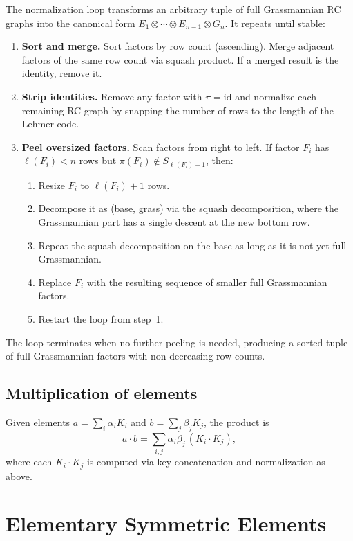 \documentclass[11pt]{article}
\newcommand{\Sym}{S}
\newcommand{\id}{\mathrm{id}}
\newcommand{\tens}{\otimes}
\theoremstyle{definition}
\begin{document}
The normalization loop transforms an arbitrary tuple of full Grassmannian RC graphs into the canonical form $E_1 \tens \cdots \tens E_{n-1} \tens G_n$.  It repeats until stable:

\begin{enumerate}
  \item \textbf{Sort and merge.}  Sort factors by row count (ascending).  Merge adjacent factors of the same row count via squash product.  If a merged result is the identity, remove it.

  \item \textbf{Strip identities.}  Remove any factor with $\pi = \id$ and normalize each remaining RC graph by snapping the number of rows to the length of the Lehmer code.

  \item \textbf{Peel oversized factors.}  Scan factors from right to left.  If factor $F_i$ has $\ell(F_i) < n$ rows but $\pi(F_i) \notin \Sym_{\ell(F_i)+1}$, then:
  \begin{enumerate}
    \item Resize $F_i$ to $\ell(F_i) + 1$ rows.
    \item Decompose it as (base, grass) via the squash decomposition, where the Grassmannian part has a single descent at the new bottom row.
    \item Repeat the squash decomposition on the base as long as it is not yet full Grassmannian.
    \item Replace $F_i$ with the resulting sequence of smaller full Grassmannian factors.
    \item Restart the loop from step~1.
  \end{enumerate}
\end{enumerate}

The loop terminates when no further peeling is needed, producing a sorted tuple of full Grassmannian factors with non-decreasing row counts.

\subsection{Multiplication of elements}

Given elements $a = \sum_i \alpha_i K_i$ and $b = \sum_j \beta_j K_j$, the product is
\[
  a \cdot b = \sum_{i,j} \alpha_i \beta_j \, (K_i \cdot K_j),
\]
where each $K_i \cdot K_j$ is computed via key concatenation and normalization as above.

\section{Elementary Symmetric Elements}
\end{document}

